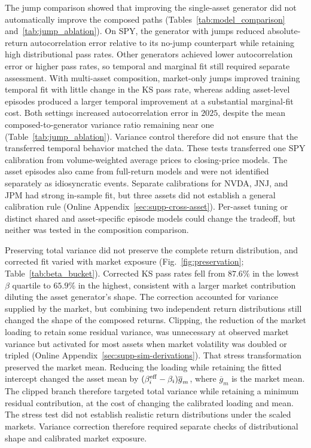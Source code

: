 The jump comparison showed that improving the single-asset generator
did not automatically improve the composed paths
(Tables~\ref{tab:model_comparison} and~\ref{tab:jump_ablation}). On
SPY, the generator with jumps reduced absolute-return autocorrelation
error relative to its no-jump counterpart while retaining high
distributional pass rates. Other generators achieved lower
autocorrelation error or higher pass rates, so temporal and marginal
fit still required separate assessment. With multi-asset composition,
market-only jumps improved training temporal fit with little change
in the KS pass rate, whereas adding asset-level episodes produced a
larger temporal improvement at a substantial marginal-fit cost. Both
settings increased autocorrelation error in $2025$, despite the mean
composed-to-generator variance ratio remaining near one
(Table~\ref{tab:jump_ablation}). Variance control therefore did not
ensure that the transferred temporal behavior matched the data. These
tests transferred one SPY calibration from volume-weighted average
prices to closing-price models. The asset episodes also came from
full-return models and were not identified separately as idiosyncratic
events. Separate calibrations for NVDA, JNJ, and JPM had strong
in-sample fit, but three assets did not establish a general calibration
rule (Online Appendix~\ref{sec:supp-cross-asset}). Per-asset tuning or distinct shared
and asset-specific episode models could change the tradeoff, but
neither was tested in the composition comparison.

Preserving total variance did not preserve the complete return
distribution, and corrected fit varied with market exposure
(Fig.~\ref{fig:preservation}; Table~\ref{tab:beta_bucket}). Corrected
KS pass rates fell from $87.6\%$ in the lowest $\beta$ quartile to
$65.9\%$ in the highest, consistent with a larger market contribution
diluting the asset generator's shape. The correction accounted for variance
supplied by the market, but combining two independent
return distributions still changed the shape of the composed returns.
Clipping, the reduction of the market loading to retain some residual
variance, was unnecessary at observed market variance but activated
for most assets when market volatility was doubled or tripled (Online Appendix~\ref{sec:supp-sim-derivations}). That stress transformation
preserved the market mean. Reducing the loading while retaining the fitted intercept changed
the asset mean by
$(\beta_i^{\mathrm{eff}}-\beta_i)\overline{g}_m$, where $\overline{g}_m$
is the market mean. The clipped branch therefore targeted total variance while retaining
a minimum residual contribution, at the cost of changing the
calibrated loading and mean. The stress test did not establish realistic return distributions
under the scaled markets. Variance correction therefore required separate checks of
distributional shape and calibrated market exposure.

